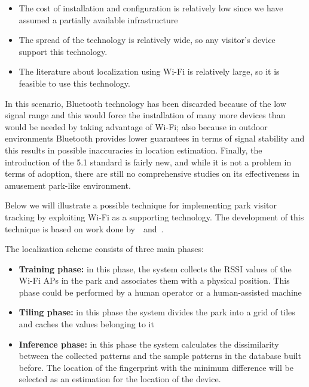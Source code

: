 \begin{itemize}
	\item The cost of installation and configuration is relatively low since we have assumed a partially available infrastructure
	\item The spread of the technology is relatively wide, so any visitor's device support this technology.
	\item The literature about localization using Wi-Fi is relatively large, so it is feasible to use this technology.
\end{itemize}

In this scenario, Bluetooth technology has been discarded because of the low signal range and this would force the installation of many more devices
than would be needed by taking advantage of Wi-Fi; also because in outdoor environments Bluetooth provides lower guarantees in terms of signal
stability and this results in possible inaccuracies in location estimation.
Finally, the introduction of the 5.1 standard is fairly new, and while it is not a problem in terms of adoption, there are still no comprehensive
studies on its effectiveness in amusement park-like environment.

Below we will illustrate a possible technique for implementing park visitor tracking by exploiting Wi-Fi as a supporting technology.
The development of this technique is based on work done by~\cite{du2018hybrid}~and~\cite{chaudhry2013indoor}.

The localization scheme consists of three main phases:

\begin{itemize}
	\item \textbf{Training phase:} in this phase, the system collects the RSSI values of the Wi-Fi APs in the park and associates them with a
	      physical position. This phase could be performed by a human operator or a human-assisted machine
	\item \textbf{Tiling phase:} in this phase the system divides the park into a grid of tiles and caches the values belonging to it
	\item \textbf{Inference phase:} in this phase the system calculates the dissimilarity between the collected patterns and the sample
	      patterns in the database built before. The location of the fingerprint with the minimum difference will be selected as an estimation for the
	      location of the device.
\end{itemize}

